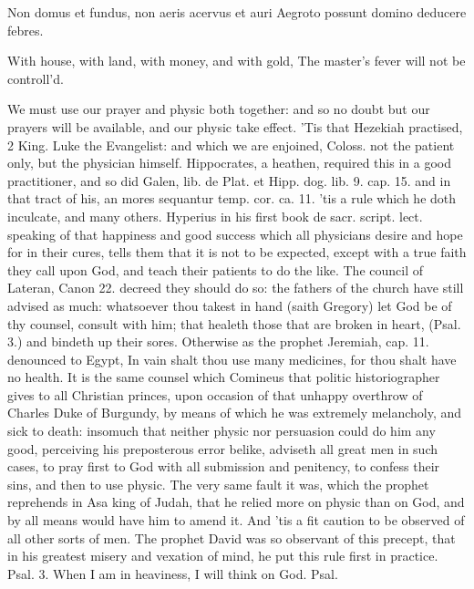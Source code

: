 {Non domus et fundus, non aeris acervus et auri
Aegroto possunt domino deducere febres.

With house, with land, with money, and with gold,
The master's fever will not be controll'd.

We must use our prayer and physic both together: and so no doubt but
our prayers will be available, and our physic take effect. 'Tis that
Hezekiah practised, 2 King.  Luke the Evangelist: and which we are
enjoined, Coloss.  not the patient only, but the physician himself.
Hippocrates, a heathen, required this in a good practitioner, and so
did Galen, lib. de Plat. et Hipp. dog. lib. 9. cap. 15. and in that
tract of his, an mores sequantur temp. cor. ca. 11. 'tis a rule which
he doth inculcate,  and many others. Hyperius in his first book
de sacr. script. lect. speaking of that happiness and good success
which all physicians desire and hope for in their cures, tells
them that it is not to be expected, except with a true faith they call
upon God, and teach their patients to do the like. The council of
Lateran, Canon 22. decreed they should do so: the fathers of the church
have still advised as much: whatsoever thou takest in hand (saith
Gregory) let God be of thy counsel, consult with him; that
healeth those that are broken in heart, (Psal.  3.) and bindeth
up their sores. Otherwise as the prophet Jeremiah, cap.  11.
denounced to Egypt, In vain shalt thou use many medicines, for thou
shalt have no health. It is the same counsel which Comineus that
politic historiographer gives to all Christian princes, upon occasion
of that unhappy overthrow of Charles Duke of Burgundy, by means of
which he was extremely melancholy, and sick to death: insomuch that
neither physic nor persuasion could do him any good, perceiving his
preposterous error belike, adviseth all great men in such cases,
to pray first to God with all submission and penitency, to
confess their sins, and then to use physic. The very same fault it was,
which the prophet reprehends in Asa king of Judah, that he relied more
on physic than on God, and by all means would have him to amend it. And
'tis a fit caution to be observed of all other sorts of men. The
prophet David was so observant of this precept, that in his greatest
misery and vexation of mind, he put this rule first in practice. Psal.
 3. When I am in heaviness, I will think on God. Psal. 
}
